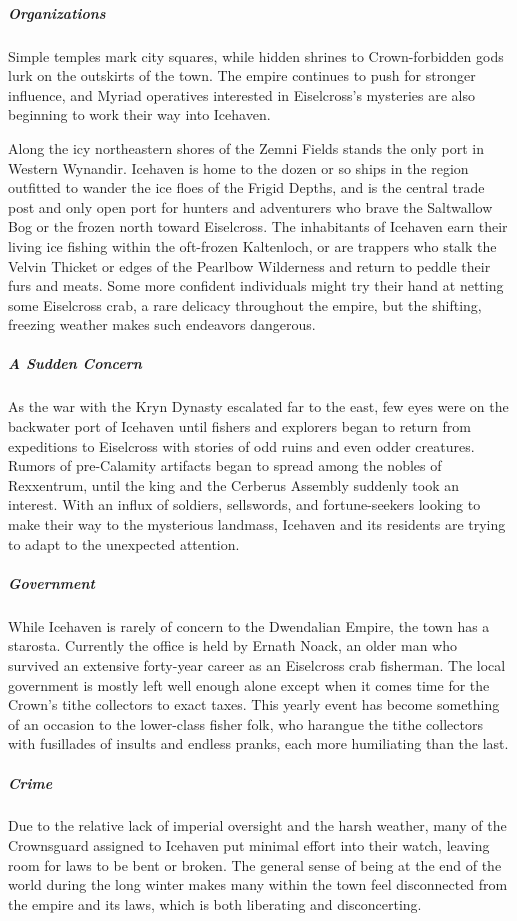 \documentclass[10pt,a4paper,twoside,bg=print,twocolumn,openany,nodeprecatedcode]{dndbook}
\begin{document}
\subparagraph{Organizations}
Simple temples mark city squares, while hidden shrines to Crown-forbidden gods lurk on the outskirts of the town. The empire continues to push for stronger influence, and Myriad operatives interested in Eiselcross's mysteries are also beginning to work their way into Icehaven.

Along the icy northeastern shores of the Zemni Fields stands the only port in Western Wynandir. Icehaven is home to the dozen or so ships in the region outfitted to wander the ice floes of the Frigid Depths, and is the central trade post and only open port for hunters and adventurers who brave the Saltwallow Bog or the frozen north toward Eiselcross. The inhabitants of Icehaven earn their living ice fishing within the oft-frozen Kaltenloch, or are trappers who stalk the Velvin Thicket or edges of the Pearlbow Wilderness and return to peddle their furs and meats. Some more confident individuals might try their hand at netting some Eiselcross crab, a rare delicacy throughout the empire, but the shifting, freezing weather makes such endeavors dangerous.

\subparagraph{A Sudden Concern}
As the war with the Kryn Dynasty escalated far to the east, few eyes were on the backwater port of Icehaven until fishers and explorers began to return from expeditions to Eiselcross with stories of odd ruins and even odder creatures. Rumors of pre-Calamity artifacts began to spread among the nobles of Rexxentrum, until the king and the Cerberus Assembly suddenly took an interest. With an influx of soldiers, sellswords, and fortune-seekers looking to make their way to the mysterious landmass, Icehaven and its residents are trying to adapt to the unexpected attention.

\subparagraph{Government}
While Icehaven is rarely of concern to the Dwendalian Empire, the town has a starosta. Currently the office is held by Ernath Noack, an older man who survived an extensive forty-year career as an Eiselcross crab fisherman. The local government is mostly left well enough alone except when it comes time for the Crown's tithe collectors to exact taxes. This yearly event has become something of an occasion to the lower-class fisher folk, who harangue the tithe collectors with fusillades of insults and endless pranks, each more humiliating than the last.

\subparagraph{Crime}
Due to the relative lack of imperial oversight and the harsh weather, many of the Crownsguard assigned to Icehaven put minimal effort into their watch, leaving room for laws to be bent or broken. The general sense of being at the end of the world during the long winter makes many within the town feel disconnected from the empire and its laws, which is both liberating and disconcerting.
\end{document}
